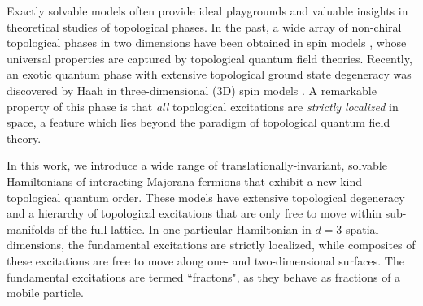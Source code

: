 \documentclass[aps,twocolumn,preprintnumbers,floatfix,showpacs,prx]{revtex4-1}
\begin{document}
Exactly solvable models often provide ideal playgrounds and valuable insights in theoretical studies of topological phases. 
In the past, a wide array of non-chiral topological phases in two dimensions 
have been obtained in spin models \cite{kitaev, levinwen}, whose universal properties are captured by topological quantum field theories.   
Recently, an exotic quantum phase with { extensive} topological ground state degeneracy was discovered by Haah in three-dimensional (3D) spin models \cite{Haah_Code}.  
A remarkable property of %
this phase is that \emph{all} topological excitations are {\em strictly localized} in space,
a feature which lies beyond the paradigm of topological quantum field theory.    


In this work, we introduce a wide range of translationally-invariant, solvable Hamiltonians of interacting Majorana fermions
that exhibit a new kind topological quantum order. These models have extensive topological degeneracy and a hierarchy of topological excitations that are only free to move within sub-manifolds of the full lattice.  In one particular Hamiltonian in $d = 3$ spatial dimensions, the fundamental excitations are strictly localized, while {composites} of these excitations are free to move along one- and two-dimensional surfaces.  The fundamental excitations are termed ``fractons",
as they behave as fractions of a mobile particle. 
\end{document}
